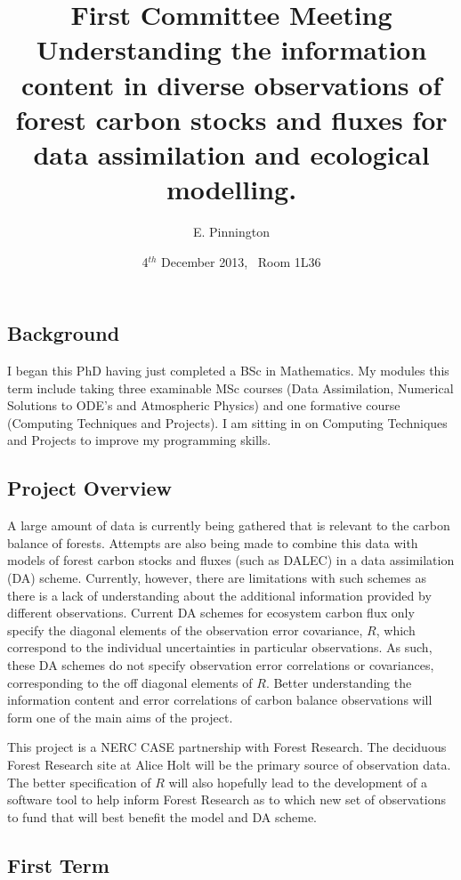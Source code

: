 \documentclass[11pt]{article}
\title{First Committee Meeting\\\vspace{4mm} \normalsize{Understanding the information content in diverse observations of forest carbon stocks and fluxes for data assimilation and ecological modelling.}}
\date{\normalsize{4$^{th}$ December 2013, \ Room 1L36}}
\author{\normalsize{E. Pinnington}}
\begin{document}
\maketitle

\subsection*{Background}

I began this PhD having just completed a BSc in Mathematics. My modules this term include taking three examinable MSc courses (Data Assimilation, Numerical Solutions to ODE's and Atmospheric Physics) and one formative course (Computing Techniques and Projects). I am sitting in on Computing Techniques and Projects to improve my programming skills. 

\subsection*{Project Overview}

A large amount of data is currently being gathered that is relevant to the carbon balance of forests. Attempts are also being made to combine this data with models of forest carbon stocks and fluxes (such as DALEC) in a data assimilation (DA) scheme. Currently, however, there are limitations with such schemes as there is a lack of understanding about the additional information provided by different observations. Current DA schemes for ecosystem carbon flux only specify the diagonal elements of the observation error covariance, $R$, which correspond to the individual uncertainties in particular observations. As such, these DA schemes do not specify observation error correlations or covariances, corresponding to the off diagonal elements of $R$. Better understanding the information content and error correlations of carbon balance observations will form one of the main aims of the project. 

This project is a NERC CASE partnership with Forest Research. The deciduous Forest Research site at Alice Holt will be the primary source of observation data. The better specification of $R$ will also hopefully lead to the development of a software tool to help inform Forest Research as to which new set of observations to fund that will best benefit the model and DA scheme.

\subsection*{First Term}
\end{document}
